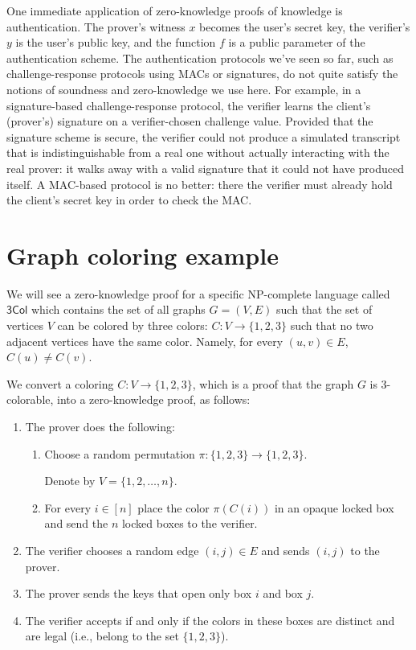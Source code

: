 One immediate application of zero-knowledge proofs of knowledge is authentication.
The prover's witness $x$ becomes the user's secret key,
the verifier's $y$ is the user's public key, and the
function $f$ is a public parameter of the authentication scheme.
The authentication protocols we've seen so far, such as challenge-response protocols using MACs or signatures,
do not quite satisfy the notions of soundness and zero-knowledge we use here.
For example, in a signature-based challenge-response protocol,
the verifier learns the client's (prover's) signature on a
verifier-chosen challenge value.
Provided that the signature scheme is secure, the verifier could not
produce a simulated transcript that is indistinguishable from a
real one without actually interacting with the real prover:
it walks away with a valid signature that it could not have produced itself.
A MAC-based protocol is no better: there the verifier must already
hold the client's secret key in order to check the MAC.

\section{Graph coloring example}

We will see a zero-knowledge proof for a specific NP-complete language called $\mathsf{3Col}$ which contains the set of all graphs $G=(V,E)$ such that the set of vertices $V$ can be colored by three colors: $C:V\rightarrow\{1,2,3\}$ such that no two adjacent vertices have the same color.  Namely, for every $(u,v)\in E$, $C(u)\neq C(v)$.


We convert a coloring $C:V\rightarrow\{1,2,3\}$, which is a proof that the graph $G$ is 3-colorable, into a zero-knowledge proof, as follows:

\begin{enumerate}
    \item The prover does the following:
    \begin{enumerate}
    \item Choose a random permutation $\pi:\{1,2,3\}\rightarrow\{1,2,3\}$. 
    
    Denote by $V=\{1,2,\ldots,n\}$.
    \item For every $i\in[n]$ place the color $\pi(C(i))$ in an opaque locked box and send the $n$ locked boxes to the verifier.
    
    \end{enumerate}
    \item The verifier chooses a random edge $(i,j)\in E$ and sends $(i,j)$ to the prover.
    \item The prover sends the keys that open only box $i$ and box $j$.
    \item The verifier accepts if and only if the colors in these boxes are distinct and are legal (i.e., belong to the set $\{1,2,3\}$).
\end{enumerate} 


